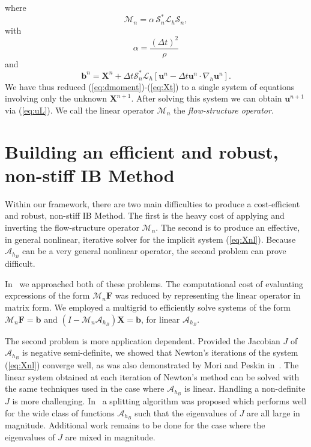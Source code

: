 \documentclass[preprint,12pt]{elsarticle}
\newcommand{\B}[1]{\mathbf{#1}}
\newcommand{\C}[1]{\mathcal{#1}}
\begin{document}
where 
\begin{equation}
 \C{M}_n =  \alpha \,  \C{S}^*_n \C{L}_h \C{S}_n,
\end{equation}
with
\begin{equation}
\alpha = \frac{(\Delta t)^2}{\rho}
\end{equation}
and 
\begin{equation}
 \B{b}^n = \B{X}^n + \Delta t \C{S}^*_n \C{L}_h [\B{u}^n-\Delta t \B{u}^n \cdot
 \nabla_h \B{u}^n]. \label{eq:bn}
\end{equation}
We have thus reduced (\ref{eq:dmoment})-(\ref{eq:Xt}) to a single system of  equations involving only the unknown $\B{X}^{n+1}$. After solving this system we can obtain $\B{u}^{n+1}$ via (\ref{eq:uL}). We call the linear operator $\C{M}_n$ the {\em flow-structure operator}.

\section{Building an efficient and robust, non-stiff IB Method}
\label{sec:Methods}
Within our framework, there are two main difficulties to produce a cost-efficient and robust, non-stiff IB Method. 
The first is the heavy cost of applying and inverting the flow-structure operator $\C{M}_n$. The second is to produce an effective, in general nonlinear, iterative solver 
for the implicit system (\ref{eq:Xnl}).  Because $\C{A}_{h_B}$ can be a very general nonlinear operator, the second problem can prove difficult.

In~\cite{IBM_Implicit2D} we approached both of these problems. The computational cost of evaluating expressions of the form $\C{M}_n\B{F}$ was reduced by representing the linear operator in matrix form. We employed a multigrid to efficiently solve systems of the form $\C{M}_n\B{F}=\B{b}$ and $(I-\C{M}_n\C{A}_{h_B})\B{X}=\B{b}$, for linear  $\C{A}_{h_B}$.

The second problem is more application dependent. Provided the Jacobian $J$ of $\C{A}_{h_B}$ is negative semi-definite, we showed that Newton's iterations of the system (\ref{eq:Xnl}) converge well, as was also demonstrated by Mori and Peskin in~\cite{MP2008}. The linear system obtained at each iteration of Newton's method can be solved with the same techniques used in the case where $\C{A}_{h_B}$ is linear.
Handling a non-definite $J$ is more challenging. In~\cite{IBM_Implicit2D} a splitting algorithm was proposed which performs well for the wide class of functions $\C{A}_{h_B}$ such that the eigenvalues of $J$ are all large in magnitude. Additional work remains to be done for the case where the eigenvalues of $J$ are mixed in magnitude.
\end{document}
